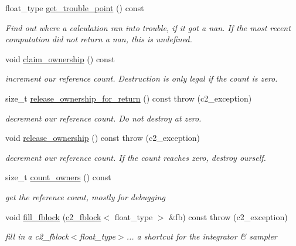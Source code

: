 \begin{DoxyCompactItemize}
float\+\_\+type \hyperlink{classc2__function_a8e575976851a0b93a9dc2803b4ac2123}{get\+\_\+trouble\+\_\+point} () const 
\begin{DoxyCompactList}\small\item\em Find out where a calculation ran into trouble, if it got a nan. If the most recent computation did not return a nan, this is undefined. \end{DoxyCompactList}\item 
void \hyperlink{classc2__function_acd32e22d0b47878dc9fb399a722db61e}{claim\+\_\+ownership} () const 
\begin{DoxyCompactList}\small\item\em increment our reference count. Destruction is only legal if the count is zero. \end{DoxyCompactList}\item 
size\+\_\+t \hyperlink{classc2__function_af003b3e29357ccf65b7eba38be877b8c}{release\+\_\+ownership\+\_\+for\+\_\+return} () const   throw (c2\+\_\+exception)
\begin{DoxyCompactList}\small\item\em decrement our reference count. Do not destroy at zero. \end{DoxyCompactList}\item 
void \hyperlink{classc2__function_ac98aa40f78c487df141a67174662d749}{release\+\_\+ownership} () const   throw (c2\+\_\+exception)
\begin{DoxyCompactList}\small\item\em decrement our reference count. If the count reaches zero, destroy ourself. \end{DoxyCompactList}\item 
size\+\_\+t \hyperlink{classc2__function_a1df932c78b3521d6a4493972f2642020}{count\+\_\+owners} () const 
\begin{DoxyCompactList}\small\item\em get the reference count, mostly for debugging \end{DoxyCompactList}\item 
void \hyperlink{classc2__function_abdce52d0b89ff5bde13d9390ff8c2ba4}{fill\+\_\+fblock} (\hyperlink{classc2__fblock}{c2\+\_\+fblock}$<$ float\+\_\+type $>$ \&fb) const   throw (c2\+\_\+exception)
\begin{DoxyCompactList}\small\item\em fill in a c2\+\_\+fblock$<$float\+\_\+type$>$... a shortcut for the integrator \& sampler \end{DoxyCompactList}\end{DoxyCompactItemize}
